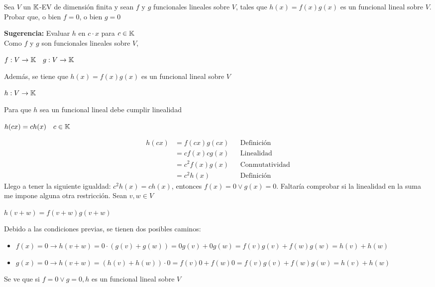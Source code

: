 \item Sea $V$ un $\mathbb{K}$-EV de dimensión finita y sean $f$ y $g$ funcionales lineales sobre $V$, tales que $h(x)=f(x)g(x)$ es un funcional lineal sobre $V$. Probar que, o bien $f=0$, o bien $g=0$
    \begin{mdframed}[style=s]
        \textbf{Sugerencia:} Evaluar $h$ en $c\cdot x$ para $c\in\mathbb{K}$\\
        Como $f$ y $g$ son funcionales lineales sobre $V$,
        \begin{tightcenter}
            $f:V\to\mathbb{K}\quad g:V\to\mathbb{K}$
        \end{tightcenter}
        Además, se tiene que $h(x)=f(x)g(x)$ es un funcional lineal sobre $V$
        \begin{tightcenter}
            $h:V\to\mathbb{K}$
        \end{tightcenter}
        Para que $h$ sea un funcional lineal debe cumplir linealidad
        \begin{tightcenter}
            $h(cx)=ch(x)\quad c\in\mathbb{K}$
        \end{tightcenter}
        \begin{align*}
            h(cx)&=f(cx)g(cx)&&\text{Definición}\\
            &=cf(x)cg(x)&&\text{Linealidad}\\
            &=c^2f(x)g(x)&&\text{Conmutatividad}\\
            &=c^2h(x)&&\text{Definición}
        \end{align*}
        Llego a tener la siguiente igualdad: $c^2h(x)=ch(x)$, entonces $f(x)=0\lor g(x)=0$. Faltaría comprobar si la linealidad en la suma me impone alguna otra restricción. Sean $v,w\in V$
        \begin{tightcenter}
            $h(v+w)=f(v+w)g(v+w)$
        \end{tightcenter}
        Debido a las condiciones previas, se tienen dos posibles caminos:
        \begin{itemize}
            \item $f(x)=0 \to h(v+w)=0\cdot (g(v)+g(w))=0g(v)+0g(w)=f(v)g(v)+f(w)g(w)=h(v)+h(w)$
            \item $g(x)=0 \to h(v+w)=(h(v)+h(w))\cdot0 =f(v)0+f(w)0=f(v)g(v)+f(w)g(w)=h(v)+h(w)$
        \end{itemize}
        Se ve que si $f=0\lor g=0, h$ es un funcional lineal sobre $V$
    \end{mdframed}